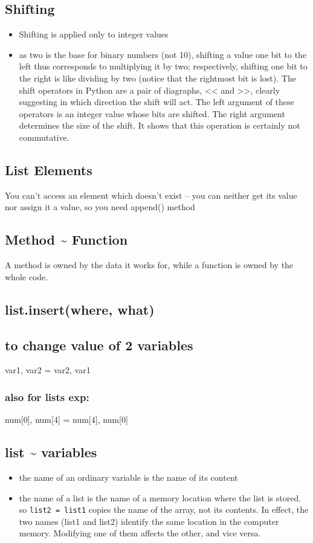 \documentclass[11pt]{article}
\begin{document}
\subsection{Shifting}
\label{sec:orgfe865a3}
\begin{itemize}
\item Shifting is applied only to integer values
\item as two is the base for binary numbers (not 10), shifting a value one
bit to the left thus corresponds to multiplying it by two;
respectively, shifting one bit to the right is like dividing by two
(notice that the rightmost bit is lost).  The shift operators in
Python are a pair of diagraphs, << and >>, clearly suggesting in
which direction the shift will act.  The left argument of these
operators is an integer value whose bits are shifted. The right
argument determines the size of the shift. It shows that this
operation is certainly not commutative.
\end{itemize}
\subsection{List Elements}
\label{sec:org49da8b5}
You can’t access an element which doesn’t exist – you can neither get
its value nor assign it a value, so you need append() method
\subsection{Method \textasciitilde{} Function}
\label{sec:orgd765d68}
A method is owned by the data it works for, while a function is owned
by the whole code.
\subsection{list.insert(where, what)}
\label{sec:orgf27f31a}
\subsection{to change value of 2 variables}
\label{sec:orgd70cee2}
var1, var2 = var2, var1
\subsubsection{also for lists exp:}
\label{sec:org23015ba}
num[0], num[4] = num[4], num[0]
\subsection{list \textasciitilde{} variables}
\label{sec:org94af4f7}
\begin{itemize}
\item the name of an ordinary variable is the name of its content
\item the name of a list is the name of a memory location where the list
is stored. so \texttt{list2 = list1} copies the name of the array, not its
contents. In effect, the two names (list1 and list2) identify the
same location in the computer memory. Modifying one of them affects
the other, and vice versa.
\end{itemize}
\end{document}

